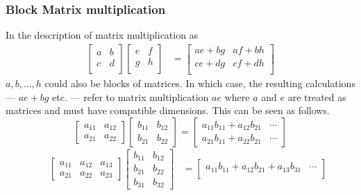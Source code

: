 \documentclass[../MathsNotesBase.tex]{subfiles}
\begin{document}
{		\subsubsection{Block Matrix multiplication}\label{sssection:block-matrix-multiplication}
		In the description of matrix multiplication as
		\begin{align*}
		\begin{bmatrix}
		a & b \\
		c & d \\
		\end{bmatrix}
		\begin{bmatrix}
		e & f \\
		g & h \\
		\end{bmatrix}
		&=
		\begin{bmatrix}
		ae + bg & af + bh \\
		ce + dg & cf + dh \\
		\end{bmatrix}
		\end{align*}
		${ a,b,\dots,h }$ could also be blocks of matrices. In which case, the resulting calculations --- ${ ae + bg }$ etc. --- refer to matrix multiplication $ae$ where $a$ and $e$ are treated as matrices and must have compatible dimensions. This can be seen as follows.
		\[ 
			\begin{bmatrix}
			a_{11} & a_{12}\\
			a_{21} & a_{22}
			\end{bmatrix} 
			\begin{bmatrix}
			b_{11} & b_{12}\\
			b_{21} & b_{22}
			\end{bmatrix}  =
			\begin{bmatrix}
			a_{11}b_{11} + a_{12}b_{21} & \cdots\\
			a_{21}b_{11} + a_{22}b_{21} & \cdots
			\end{bmatrix} 
		\]
		\begin{align*}
		&& \begin{bmatrix}
			a_{11} & a_{12} & a_{13}\\
			a_{21} & a_{22} & a_{23}
			\end{bmatrix} 
			\begin{bmatrix}
			b_{11} & b_{12}\\
			b_{21} & b_{22} \\
			b_{31} & b_{32}
			\end{bmatrix} &= 
			\begin{bmatrix}
			a_{11}b_{11} + a_{12}b_{21} + a_{13}b_{31} & \cdots\\

\end{bmatrix}
\end{align*}}
\end{document}
